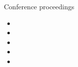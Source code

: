 \documentclass{resume}
\begin{document}


\newpage

\begin{rSection}{Conference proceedings}
\begin{itemize}
\item {}
\item {}
\item {}
\item {}
\item {}
\end{itemize}

\end{rSection}

\end{document}
